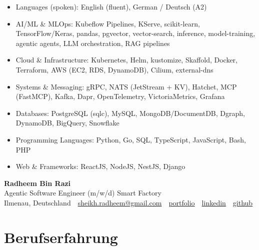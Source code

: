\documentclass[10pt,a4paper]{resume}
\makeatletter
\newcommand{\Portfolio}{https://radheem.github.io/my-cv}
\newcommand{\PortfolioText}{portfolio}
\newcommand{\GitHub}{https://github.com/radheem}
\newcommand{\LinkedIn}{https://www.linkedin.com/in/radheem-razi}
\newcommand{\Email}{sheikh.radheem@gmail.com}
\makeatother
\begin{document}
\begin{itemize}[leftmargin=1.4em,nosep,topsep=2pt]
  \item Languages (spoken): English (fluent), German / Deutsch (A2)
  \item AI/ML \& MLOps: Kubeflow Pipelines, KServe, scikit-learn, TensorFlow/Keras, pandas, pgvector, vector-search, inference, model-training, agentic agents, LLM orchestration, RAG pipelines
  \item Cloud \& Infrastructure: Kubernetes, Helm, kustomize, Skaffold, Docker, Terraform, AWS (EC2, RDS, DynamoDB), Cilium, external-dns
  \item Systems \& Messaging: gRPC, NATS (JetStream + KV), Hatchet, MCP (FastMCP), Kafka, Dapr, OpenTelemetry, VictoriaMetrics, Grafana
  \item Databases: PostgreSQL (sqlc), MySQL, MongoDB/DocumentDB, Dgraph, DynamoDB, BigQuery, Snowflake
  \item Programming Languages: Python, Go, SQL, TypeScript, JavaScript, Bash, PHP
  \item Web \& Frameworks: ReactJS, NodeJS, NestJS, Django
\end{itemize}

\clearpage
{}

\begin{center}
  {\huge\bfseries Radheem Bin Razi}\\[3pt]
  {\large Agentic Software Engineer (m/w/d) Smart Factory}\\[6pt]
  \small
  Ilmenau, Deutschland \,\textbar\,
  \href{mailto:\Email}{\Email} \,\textbar\,
  \href{\Portfolio}{\PortfolioText} \,\textbar\,
  \href{\LinkedIn}{linkedin} \,\textbar\,
  \href{\GitHub}{github}
\end{center}
\vspace{2pt}

\section{Berufserfahrung}
\end{document}
